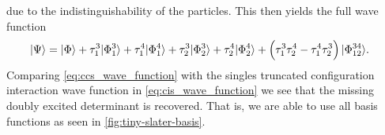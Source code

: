             due to the indistinguishability of the particles.
            This then yields the full wave function
            \begin{align}
                | \Psi \rangle
                &= | \Phi \rangle
                + \tau^{3}_{1}| \Phi^{3}_{1} \rangle
                + \tau^{4}_{1}| \Phi^{4}_{1} \rangle
                + \tau^{3}_{2}| \Phi^{3}_{2} \rangle
                + \tau^{4}_{2}| \Phi^{4}_{2} \rangle
                + \left( 
                    \tau^{3}_{1}\tau^{4}_{2}
                    - \tau^{4}_{1}\tau^{3}_{2}
                 \right)
                | \Phi^{34}_{12} \rangle.
                \label{eq:ccs_wave_function}
            \end{align}
            Comparing \autoref{eq:ccs_wave_function} with the singles truncated
            configuration interaction wave function in
            \autoref{eq:cis_wave_function} we see that the missing doubly
            excited determinant is recovered.
            That is, we are able to use all basis functions as seen in
            \autoref{fig:tiny-slater-basis}.

